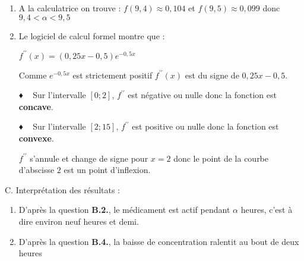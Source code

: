 \begin{corrige}
\begin{enumerate}
          \item
          A la calculatrice on trouve : $f\left(9,4\right)\approx 0,104$ et $f\left(9,5\right)\approx 0,099$ donc $9,4 < \alpha  < 9,5$
          \item
          Le logiciel de calcul formel montre que :
          \par
          $f^{\prime\prime}\left(x\right) = \left(0,25x-0,5\right) e^{-0,5x}$
          \par
          Comme $e^{- 0,5x}$ est strictement positif $f^{\prime\prime}\left(x\right)$ est du signe de $0,25x-0,5$.
          \par
          ♦ ~ Sur l'intervalle $\left[0; 2\right]$, $f^{\prime\prime}$ est négative ou nulle donc la fonction est \textbf{concave}.
          \par
          ♦ ~ Sur l'intervalle $\left[2; 15\right]$, $f^{\prime\prime}$ est positive ou nulle donc la fonction est \textbf{convexe}.
          \par
          $f^{\prime\prime}$ s'annule et change de signe pour $x=2$ donc le point de la courbe d'abscisse $2$ est un point d'inflexion.
     \end{enumerate}
     \begin{h3}C. Interprétation des résultats :\end{h3}
     \begin{enumerate}
          \item
          D'après la question \textbf{B.2.}, le médicament est actif pendant $\alpha $ heures, c'est à dire environ neuf heures et demi.
          \item
          D'après la question \textbf{B.4.}, la baisse de concentration ralentit au bout de deux heures
     \end{enumerate}
\end{corrige}
